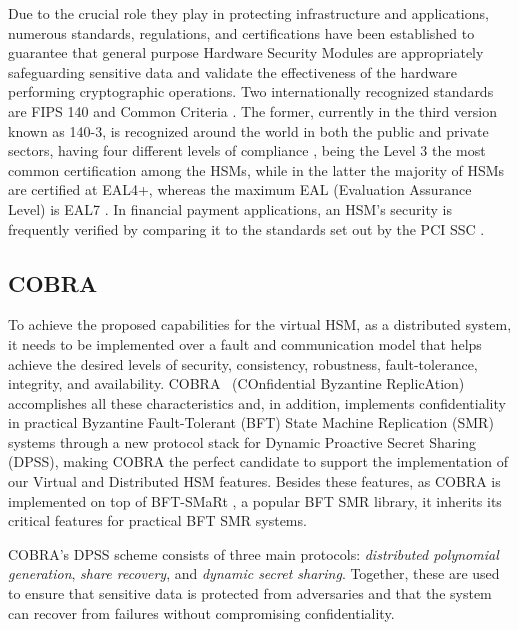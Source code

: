 \documentclass[runningheads]{llncs}
\begin{document}
Due to the crucial role they play in protecting infrastructure and applications, numerous standards, regulations, and certifications have been established to guarantee that general purpose Hardware Security Modules are appropriately safeguarding sensitive data and validate the effectiveness of the hardware performing cryptographic operations. Two internationally recognized standards are FIPS 140 \cite{fips140} and Common Criteria \cite{commoncriteria}. The former, currently in the third version known as 140-3, is recognized around the world in both the public and private sectors, having four different levels of compliance \cite{fipslevels}, being the Level 3 the most common certification among the HSMs, while in the latter the majority of HSMs are certified at EAL4+, whereas the maximum EAL (Evaluation Assurance Level) is EAL7 \cite{commoncriteriacert}. In financial payment applications, an HSM's security is frequently verified by comparing it to the standards set out by the PCI SSC \cite{pcissc}.


\subsection{COBRA} \label{subsec:cobra}
To achieve the proposed capabilities for the virtual HSM, as a distributed system, it needs to be implemented over a fault and communication model that helps achieve the desired levels of security, consistency, robustness, fault-tolerance, integrity, and availability. COBRA~\cite{cobra} (COnfidential Byzantine ReplicAtion) accomplishes all these characteristics and, in addition, implements confidentiality in practical Byzantine Fault-Tolerant (BFT) State Machine Replication (SMR) systems through a new protocol stack for Dynamic Proactive Secret Sharing (DPSS), making COBRA the perfect candidate to support the implementation of our Virtual and Distributed HSM features. Besides these features, as COBRA is implemented on top of BFT-SMaRt \cite{bftsmart}, a popular BFT SMR library, it inherits its critical features for practical BFT SMR systems.

COBRA's DPSS scheme consists of three main protocols: \textit{distributed polynomial generation}, \textit{share recovery}, and \textit{dynamic secret sharing}. Together, these are used to ensure that sensitive data is protected from adversaries and that the system can recover from failures without compromising confidentiality.
\end{document}
